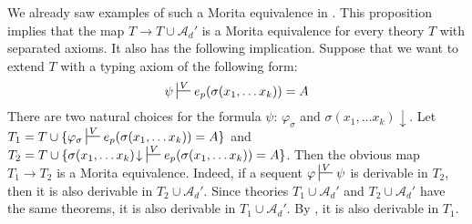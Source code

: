 \documentclass[reqno]{amsart}
\theoremstyle{definition}
\theoremstyle{remark}
\numberwithin{figure}{section}
\begin{document}
\begin{example}
We already saw examples of such a Morita equivalence in .
This proposition implies that the map $T \to T \cup \mathcal{A}_d'$ is a Morita equivalence for every theory $T$ with separated axioms.
It also has the following implication.
Suppose that we want to extend $T$ with a typing axiom of the following form:
\[ \psi \sststile{}{V} e_p(\sigma(x_1, \ldots x_k)) = A \]
There are two natural choices for the formula $\psi$: $\varphi_\sigma$ and $\sigma(x_1, \ldots x_k)\!\downarrow$.
Let $T_1 = T \cup \{ \varphi_\sigma \sststile{}{V} e_p(\sigma(x_1, \ldots x_k)) = A \}$ and $T_2 = T \cup \{ \sigma(x_1, \ldots x_k)\!\downarrow\ \sststile{}{V} e_p(\sigma(x_1, \ldots x_k)) = A \}$.
Then the obvious map $T_1 \to T_2$ is a Morita equivalence.
Indeed, if a sequent $\varphi \sststile{}{V} \psi$ is derivable in $T_2$, then it is also derivable in $T_2 \cup \mathcal{A}_d'$.
Since theories $T_1 \cup \mathcal{A}_d'$ and $T_2 \cup \mathcal{A}_d'$ have the same theorems, it is also derivable in $T_1 \cup \mathcal{A}_d'$.
By , it is also derivable in $T_1$.
\end{example}
\end{document}
